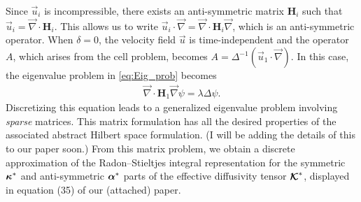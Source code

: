 \documentclass{article}
\newcommand{\Hb}{\mathbf{H}}
\newcommand\bkappa{\mbox{\boldmath${\kappa}$}}
\newcommand\balpha{\mbox{\boldmath${\alpha}$}}
\newcommand\Kbc{\mbox{\boldmath${\mathcal{K}}$}}
\newcommand{\0}{\mathbf{0}}
\newcommand{\1}{\mathbf{1}}
\newcommand{\2}{\mathbf{2}}
\newcommand{\3}{\mathbf{3}}
\newcommand{\4}{\mathbf{4}}
\newcommand{\5}{\mathbf{5}}
\newcommand{\6}{\mathbf{6}}
\newcommand{\7}{\mathbf{7}}
\newcommand{\8}{\mathbf{8}}
\begin{document}
Since $\vec{u}_i$ is incompressible, there exists
an anti-symmetric matrix $\Hb_i$ such that
$\vec{u}_i=\vec{\nabla}\cdot\Hb_i$. This allows us to write
$\vec{u}_i\cdot\vec{\nabla}=\vec{\nabla}\cdot\Hb_i\vec{\nabla}$, which is an anti-symmetric
operator. When $\delta=0$, the velocity field $\vec{u}$ is time-independent
and the operator $A$, which arises from the cell problem, becomes
$A=\Delta^{-1}(\vec{u}_1\cdot\vec{\nabla})$. In this case, the eigenvalue problem in
\eqref{eq:Eig_prob} becomes 
%
\begin{align}\label{eq:Eig_prob_steady}
  \vec{\nabla}\cdot\Hb_1\vec{\nabla}\psi=\lambda\Delta\psi.
\end{align}
%
Discretizing this equation leads to a generalized eigenvalue
problem involving \emph{sparse} matrices. This matrix formulation has
all the desired properties of the associated abstract Hilbert space
formulation. (I will be adding the details of this to our paper soon.)
From this matrix problem, we obtain a discrete approximation of the
Radon--Stieltjes integral representation for the symmetric $\bkappa^*$
and anti-symmetric $\balpha^*$ parts of the effective diffusivity
tensor $\Kbc^*$, displayed in equation (35) of our (attached) paper.  
\end{document}
